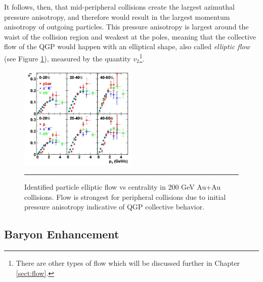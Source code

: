 It follows, then, that mid-peripheral collisions create the largest azimuthal pressure anisotropy, and therefore would result in the largest momentum anisotropy of outgoing particles. This pressure anisotropy is largest around the waist of the collision region and weakest at the poles, meaning that the collective flow of the QGP would happen with an elliptical shape, also called \textit{elliptic flow} (see Figure \ref{fig:v2auau}), measured by the quantity $v_2$\footnote{There are other types of flow which will be discussed further in Chapter \ref{sect:flow}.}.
    
\begin{figure}[htbp]
\centering 	
    \includegraphics[width=0.5\textwidth]{prevplots/v2auau.jpg}
\rule{35em}{0.5pt}
	\caption[Identified particle elliptic flow vs centrality in 200 GeV Au+Au collisions]{Identified particle elliptic flow vs centrality in 200 GeV Au+Au collisions. Flow is strongest for peripheral collisions due to initial pressure anisotropy indicative of QGP collective behavior. \citep{Adler:2003kt}}
\label{fig:v2auau}	
\end{figure}

\subsection{Baryon Enhancement}

